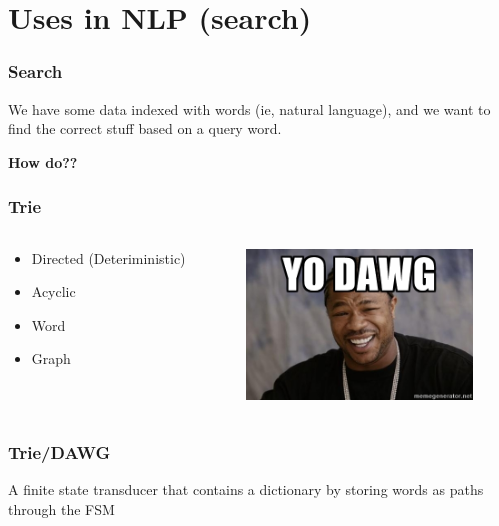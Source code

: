 \documentclass[10pt]{beamer}
\begin{document}
\section{Uses in NLP (search)}


\begin{frame}[fragile]
  \frametitle{Search}

  We have some data indexed with words (ie, natural language), and we want to find the correct stuff based on a query word. 

  \pause

  \textbf{How do??}  
\end{frame}

\begin{frame}[fragile]
  \frametitle{Trie}

  \pause
  \begin{columns}[T]
  \begin{column}{.48\textwidth}
  \begin{itemize}[<+->]
    \item Directed (Deteriministic)
    \item Acyclic
    \item Word
    \item Graph
  \end{itemize}
  \end{column}

  \pause
  

  \begin{column}{.48\textwidth}
  \centerline{\includegraphics[width=6cm]{yodawg.jpg}}


  \end{column}
  \end{columns}
  

\end{frame}


\begin{frame}[fragile]
  \frametitle{Trie/DAWG}

  A finite state transducer that contains a dictionary by storing words as paths through the FSM 

\end{frame}
\end{document}

